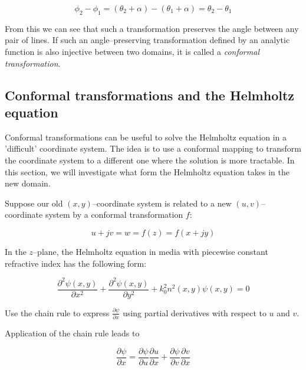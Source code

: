 \begin{equation}
\phi_2 - \phi_1 = (\theta_2 + \alpha) - (\theta_1 + \alpha) = \theta_2 -
\theta_1
\end{equation} 

From this we can see that such a transformation preserves the angle between any pair of lines. If such an angle--preserving transformation defined by an analytic function is also injective between two domains, it is called a \emph{conformal transformation}.

\subsection*{Conformal transformations and the Helmholtz equation}

Conformal transformations can be useful to solve the Helmholtz equation in a 'difficult' coordinate system. The idea is to use a conformal mapping to transform the coordinate system to a different one where the solution is more tractable. In this section, we will investigate what form the Helmholtz equation takes in the new domain.

Suppose our old $(x,y)$--coordinate system is related to a new $(u,v)$--coordinate system by a conformal transformation $f$:

\begin{equation}
u+jv = w = f(z) = f(x+jy)
\end{equation} 

In the $z$--plane, the Helmholtz equation in media with piecewise constant refractive index has the following form:

\begin{equation}
\frac{\partial^2 \psi(x,y)}{\partial x^2} + \frac{\partial^2 \psi(x,y)}{\partial y^2} + k_0^2 n^2(x,y) \psi(x,y) = 0
\end{equation}

\begin{cue}
Use the chain rule to express $\frac{\partial \psi}{\partial x}$ using partial derivatives with respect to $u$ and $v$.
\end{cue}

Application of the chain rule leads to

\begin{equation}
\frac{\partial \psi}{\partial x} = \frac{\partial \psi}{\partial u}
\frac{\partial u}{\partial x} + \frac{\partial \psi}{\partial v} \frac{\partial
v}{\partial x}
\end{equation} 

